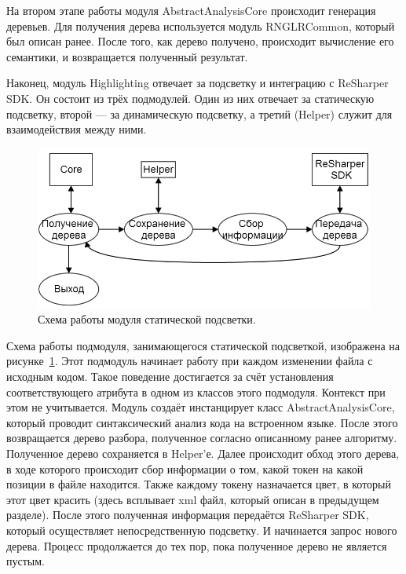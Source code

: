 На втором этапе работы модуля AbstractAnalysisCore происходит генерация деревьев. Для получения дерева используется модуль RNGLRCommon, который был описан ранее. После того, как дерево получено, происходит вычисление его семантики, и возвращается полученный результат. 

Наконец, модуль Highlighting отвечает за подсветку и интеграцию с ReSharper SDK. Он состоит из трёх подмодулей. Один из них отвечает за статическую подсветку, второй --- за динамическую подсветку, а третий (Helper) служит для взаимодействия между ними. 

\begin{figure}[t]
\centering
\includegraphics[width=\linewidth]{Ivanov/Pictures/staticHighlighting.png}
\caption{Схема работы модуля статической подсветки.}
\label{staticHighlighting}
\end{figure}

Схема работы подмодуля, занимающегося статической подсветкой, изображена на рисунке~\ref{staticHighlighting}. Этот подмодуль начинает работу при каждом изменении файла с исходным кодом. Такое поведение достигается за счёт установления соответствующего атрибута в одном из классов этого подмодуля. Контекст при этом не учитывается. Модуль создаёт инстанцирует класс AbstractAnalysisCore, который проводит синтаксический анализ кода на встроенном языке. После этого возвращается дерево разбора, полученное согласно описанному ранее алгоритму. Полученное дерево сохраняется в Helper’е. Далее происходит обход этого дерева, в ходе которого происходит сбор информации о том, какой токен на какой позиции в файле находится. Также каждому токену назначается цвет, в который этот цвет красить (здесь всплывает xml файл, который описан в предыдущем разделе). После этого полученная информация передаётся ReSharper SDK, который осуществляет непосредственную подсветку. И начинается запрос нового дерева. Процесс продолжается до тех пор, пока полученное дерево не является пустым.

